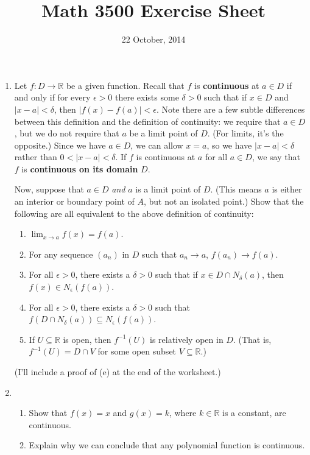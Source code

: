 \documentclass[letterpaper,12pt]{article}
\title{Math 3500 Exercise Sheet}
\date{22 October, 2014}
\newcommand{\R}{\mathbb{R}}
\newcommand{\abs}[1]{\lvert #1\rvert}
\begin{document}
\maketitle

\begin{enumerate}
 \item Let $f:D\to \R$ be a given function. Recall that $f$ is {\bf continuous} at $a\in D$ if and only if for every $\epsilon>0$ there exists some $\delta>0$ such that if $x\in D$ and $\abs{x-a}<\delta$, then $\abs{f(x)-f(a)}<\epsilon$. Note there are a few subtle differences between this definition and the definition of continuity: we require that $a\in D$, but we do not require that $a$ be a limit point of $D$. (For limits, it's the opposite.) Since we have $a\in D$, we can allow $x=a$, so we have $\abs{x-a}<\delta$ rather than $0<\abs{x-a}<\delta$. If $f$ is continuous at $a$ for all $a\in D$, we say that $f$ is {\bf continuous on its domain} $D$.

 Now, suppose that $a\in D$ {\em and} $a$ is a limit point of $D$. (This means $a$ is either an interior or boundary point of $A$, but not an isolated point.) Show that the following are all equivalent to the above definition of continuity:
\begin{enumerate}
 \item $\displaystyle \lim_{x\to a}f(x) = f(a)$.
 \item For any sequence $(a_n)$ in $D$ such that $a_n\to a$, $f(a_n)\to f(a)$.
 \item For all $\epsilon>0$, there exists a $\delta>0$ such that if $x\in D\cap N_\delta(a)$, then $f(x)\in N_\epsilon(f(a))$.
 \item For all $\epsilon>0$, there exists a $\delta>0$ such that $f(D\cap N_\delta(a))\subseteq N_\epsilon(f(a))$.
 \item If $U\subseteq \R$ is open, then $f^{-1}(U)$ is relatively open in $D$. (That is, $f^{-1}(U) = D\cap V$ for some open subset $V\subseteq \R$.) 
\end{enumerate}
(I'll include a proof of (e) at the end of the worksheet.)

\item\begin{enumerate}
      \item Show that $f(x)=x$ and $g(x)=k$, where $k\in\R$ is a constant, are continuous.
      \item Explain why we can conclude that any polynomial function is continuous.
     \end{enumerate}


\end{enumerate}
\end{document}
